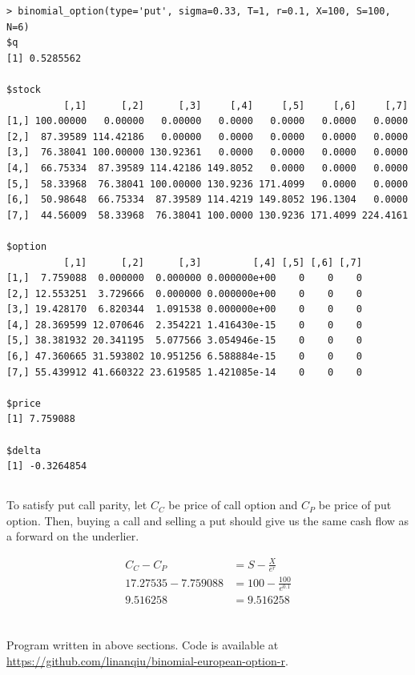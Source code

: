 \documentclass[11pt]{scrartcl}
\begin{document}
\begin{lstlisting}
> binomial_option(type='put', sigma=0.33, T=1, r=0.1, X=100, S=100, N=6)
$q
[1] 0.5285562

$stock
          [,1]      [,2]      [,3]     [,4]     [,5]     [,6]     [,7]
[1,] 100.00000   0.00000   0.00000   0.0000   0.0000   0.0000   0.0000
[2,]  87.39589 114.42186   0.00000   0.0000   0.0000   0.0000   0.0000
[3,]  76.38041 100.00000 130.92361   0.0000   0.0000   0.0000   0.0000
[4,]  66.75334  87.39589 114.42186 149.8052   0.0000   0.0000   0.0000
[5,]  58.33968  76.38041 100.00000 130.9236 171.4099   0.0000   0.0000
[6,]  50.98648  66.75334  87.39589 114.4219 149.8052 196.1304   0.0000
[7,]  44.56009  58.33968  76.38041 100.0000 130.9236 171.4099 224.4161

$option
          [,1]      [,2]      [,3]         [,4] [,5] [,6] [,7]
[1,]  7.759088  0.000000  0.000000 0.000000e+00    0    0    0
[2,] 12.553251  3.729666  0.000000 0.000000e+00    0    0    0
[3,] 19.428170  6.820344  1.091538 0.000000e+00    0    0    0
[4,] 28.369599 12.070646  2.354221 1.416430e-15    0    0    0
[5,] 38.381932 20.341195  5.077566 3.054946e-15    0    0    0
[6,] 47.360665 31.593802 10.951256 6.588884e-15    0    0    0
[7,] 55.439912 41.660322 23.619585 1.421085e-14    0    0    0

$price
[1] 7.759088

$delta
[1] -0.3264854
\end{lstlisting}

\subsection{}

To satisfy put call parity, let $C_C$ be price of call option and $C_P$ be price of put option. Then, buying a call and selling a put should give us the same cash flow as a forward on the underlier.

\begin{align*}
C_C - C_P &= S - \frac{X}{e^r} \\
17.27535 - 7.759088 &= 100 - \frac{100}{e^{0.1}} \\
9.516258 &= 9.516258
\end{align*}


\section{}

Program written in above sections. Code is available at \url{https://github.com/linanqiu/binomial-european-option-r}.
\end{document}
